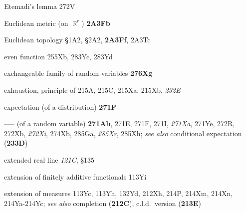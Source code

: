 Etemadi's lemma 272V




Euclidean metric (on $\BbbR^r$) {\bf 2A3Fb}


Euclidean topology \S1A2, \S2A2, {\bf 2A3Ff}, 2A3Tc



even function 255Xb, 283Yc, 283Yd




exchangeable family of random variables {\bf 276Xg}




exhaustion, principle of 215A, 215C, 215Xa, 215Xb,
{\it 232E}











expectation (of a distribution) {\bf 271F}


----- (of a random variable) {\bf 271Ab}, 271E, 271F, 271I,
{\it 271Xa}, 271Ye,
272R, 272Xb, {\it 272Xi}, 274Xb, 285Ga, {\it 285Xr}, 285Xh;
  {\it see also} conditional expectation ({\bf 233D})











extended real line {\it 121C}, \S135





extension of finitely additive functionals 113Yi



extension of measures 113Yc, 113Yh, 132Yd,
  212Xh, 214P, 214Xm, 214Xn,
214Ya-214Yc;  
  {\it see also} completion ({\bf 212C}), c.l.d.\ version ({\bf 213E})
  

















\indexmedskip




